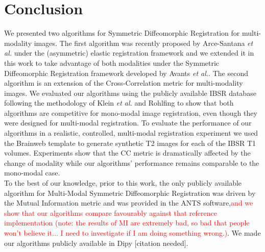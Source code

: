 \section{Conclusion}
We presented two algorithms for Symmetric Diffeomorphic Registration for multi-modality images. The first algorithm was recently proposed by Arce-Santana {\it et al.}
\cite{Arce-santana2014} under the (asymmetric) elastic registration framework and we extended it in this work to take advantage of both modalities under the
Symmetric Diffeomorphic Registration framework developed by Avants {\it et al.}. The second algorithm is an extension of the Cross-Correlation metric for multi-modality
images. We evaluated our algorithms using the publicly available IBSR database following the methodology of Klein {\it et al.} \cite{Klein2009}\cite{Klein2010} and
Rohlfing \cite{Rohlfing2012} to show that both algorithms are competitive for mono-modal image registration, even though they were designed for multi-modal registration.
To evaluate the performance of our algorithms in a realistic, controlled, multi-modal registration experiment we used the Brainweb\cite{Cocosco1997}\cite{Kwan1999} template
to generate synthetic T2 images for each of the IBSR T1 volumes. Experiments show that the CC metric is dramatically affected by the change of modality while our algorithms'
performance remains comparable to the mono-modal case.\\

To the best of our knowledge, prior to this work, the only publicly available algorithm for Multi-Modal Symmetric Diffeomorphic Registration was driven by the Mutual Information
metric and was provided in the ANTS software,\textcolor{red}{and we show that our algorithms compare favourably against that reference implementation (note: the results of
MI are extremely bad, so bad that people won't believe it... I need to investigate if I am doing something wrong.)}. We made our algorithms publicly available in Dipy
[citation needed].
